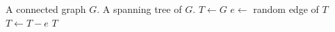 
\begin{algorithmic}[1]
\Require A connected graph $G$.
\Ensure A spanning tree of $G$.
\State $T \gets G$
  \State $e \gets$ random edge of $T$
    \State $T \gets T - e$
  \EndIf
\EndWhile
\State \Return $T$
\end{algorithmic}
